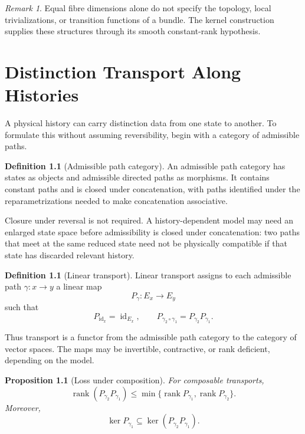 \documentclass[11pt,oneside]{book}
\newtheorem{proposition}[theorem]{Proposition}
\theoremstyle{definition}
\newtheorem{definition}[theorem]{Definition}
\theoremstyle{remark}
\newtheorem{remark}[theorem]{Remark}
\DeclareMathOperator{\id}{id}
\begin{document}
\begin{remark}
Equal fibre dimensions alone do not specify the topology, local
trivializations, or transition functions of a bundle. The kernel
construction supplies these structures through its smooth
constant-rank hypothesis.
\end{remark}


\chapter{Distinction Transport Along Histories}

A physical history can carry distinction data from one state to
another. To formulate this without assuming reversibility, begin
with a category of admissible paths.

\begin{definition}[Admissible path category]
An admissible path category has states as objects and admissible
directed paths as morphisms. It contains constant paths and is
closed under concatenation, with paths identified under the
reparametrizations needed to make concatenation associative.
\end{definition}

Closure under reversal is not required. A history-dependent model
may need an enlarged state space before admissibility is closed
under concatenation: two paths that meet at the same reduced state
need not be physically compatible if that state has discarded
relevant history.

\begin{definition}[Linear transport]
Linear transport assigns to each admissible path
$\gamma:x\to y$ a linear map
\[
P_\gamma:E_x\longrightarrow E_y
\]
such that
\[
P_{\operatorname{id}_x}=\id_{E_x},
\qquad
P_{\gamma_2\circ\gamma_1}
=P_{\gamma_2}P_{\gamma_1}.
\]
\end{definition}

Thus transport is a functor from the admissible path category to
the category of vector spaces. The maps may be invertible,
contractive, or rank deficient, depending on the model.

\begin{proposition}[Loss under composition]
For composable transports,
\[
\operatorname{rank}(P_{\gamma_2}P_{\gamma_1})
\leq
\min\{\operatorname{rank}P_{\gamma_1},
      \operatorname{rank}P_{\gamma_2}\}.
\]
Moreover,
\[
\operatorname{ker}P_{\gamma_1}
\subseteq
\operatorname{ker}(P_{\gamma_2}P_{\gamma_1}).
\]
\end{proposition}
\end{document}
